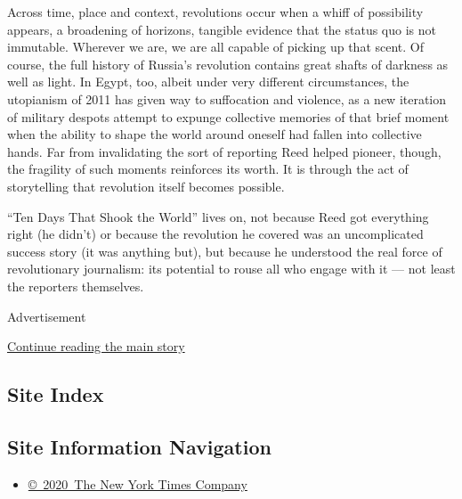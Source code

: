 Across time, place and context, revolutions occur when a whiff of
possibility appears, a broadening of horizons, tangible evidence that
the status quo is not immutable. Wherever we are, we are all capable of
picking up that scent. Of course, the full history of Russia's
revolution contains great shafts of darkness as well as light. In Egypt,
too, albeit under very different circumstances, the utopianism of 2011
has given way to suffocation and violence, as a new iteration of
military despots attempt to expunge collective memories of that brief
moment when the ability to shape the world around oneself had fallen
into collective hands. Far from invalidating the sort of reporting Reed
helped pioneer, though, the fragility of such moments reinforces its
worth. It is through the act of storytelling that revolution itself
becomes possible.

``Ten Days That Shook the World'' lives on, not because Reed got
everything right (he didn't) or because the revolution he covered was an
uncomplicated success story (it was anything but), but because he
understood the real force of revolutionary journalism: its potential to
rouse all who engage with it --- not least the reporters themselves.

Advertisement

\protect\hyperlink{after-bottom}{Continue reading the main story}

\hypertarget{site-index}{%
\subsection{Site Index}\label{site-index}}

\hypertarget{site-information-navigation}{%
\subsection{Site Information
Navigation}\label{site-information-navigation}}

\begin{itemize}
\tightlist
\item
  \href{https://help.nytimes.com/hc/en-us/articles/115014792127-Copyright-notice}{©~2020~The
  New York Times Company}
\end{itemize}

